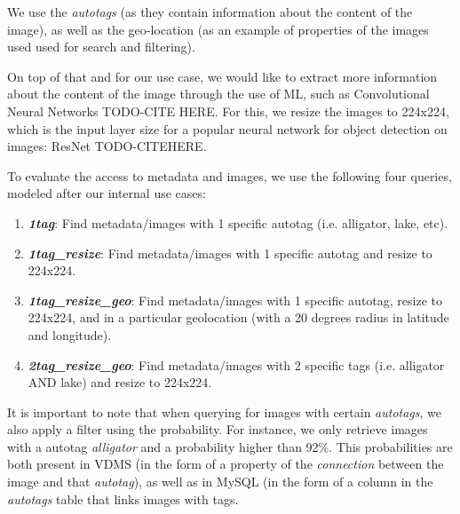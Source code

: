 We use the \textit{autotags} (as they contain information about
the content of the image), as well as the geo-location
(as an example of properties of the images used used for search and filtering).

On top of that and for our use case, we would like to extract more information
about the content of the image through the use of ML,
such as Convolutional Neural Networks TODO-CITE HERE.
For this, we resize the images to 224x224, which is the input layer size for
a popular neural network for object detection on images: ResNet TODO-CITEHERE.

To evaluate the access to metadata and images,
we use the following four queries, modeled after our internal use cases:
\begin{enumerate}
\item {\bf {\em 1tag}}: Find metadata/images with 1 specific autotag (i.e. alligator, lake, etc).
\item {\bf {\em 1tag\_resize}}: Find metadata/images with 1 specific autotag and resize to 224x224.
\item {\bf {\em 1tag\_resize\_geo}}: Find metadata/images with 1 specific autotag, resize to 224x224, and in a particular geolocation (with a 20 degrees radius in latitude and longitude).
\item {\bf {\em 2tag\_resize\_geo}}: Find metadata/images with 2 specific tags (i.e. alligator AND lake) and resize to 224x224.
\end{enumerate}

It is important to note that when querying for images with certain
\textit{autotags}, we also apply a filter using the probability.
For instance, we only retrieve images with a autotag \textit{alligator}
and a probability higher than 92\%.
This probabilities are both present in VDMS (in the form of a property
of the \textit{connection} between the image and that \textit{autotag}),
as well as in MySQL (in the form of a column in the \textit{autotags} table
that links images with tags.

